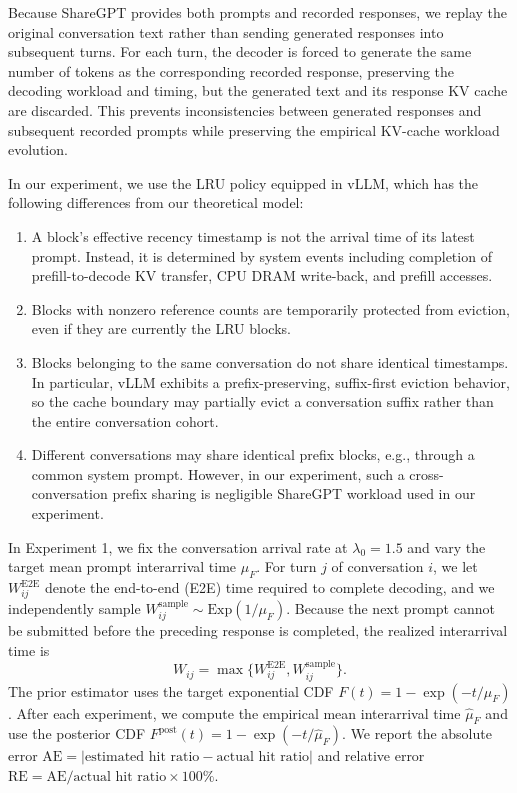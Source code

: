 \documentclass{article}
\theoremstyle{definition}
\newcommand{\Exp}{\text{Exp}}
\begin{document}
Because ShareGPT provides both prompts and recorded responses, we replay the original conversation text rather than sending generated responses into subsequent turns. For each turn, the decoder is forced to generate the same number of tokens as the corresponding recorded response, preserving the decoding workload and timing, but the generated text and its response KV cache are discarded. This prevents inconsistencies between generated responses and subsequent recorded prompts while preserving the empirical KV-cache workload evolution.

In our experiment, we use the LRU policy equipped in vLLM, which has the following differences from our theoretical model:
\begin{enumerate}
    \item A block's effective recency timestamp is not the arrival time of its latest prompt. Instead, it is determined by system events including completion of prefill-to-decode KV transfer, CPU DRAM write-back, and prefill accesses.
    \item Blocks with nonzero reference counts are temporarily protected from eviction, even if they are currently the LRU blocks.
    \item Blocks belonging to the same conversation do not share identical timestamps. In particular, vLLM exhibits a prefix-preserving, suffix-first eviction behavior, so the cache boundary may partially evict a conversation suffix rather than the entire conversation cohort.
    \item Different conversations may share identical prefix blocks, e.g., through a common system prompt. However, in our experiment, such a cross-conversation prefix sharing is negligible ShareGPT workload used in our experiment.
\end{enumerate}

In Experiment 1, we fix the conversation arrival rate at $\lambda_0=1.5$ and vary the target mean prompt interarrival time $\mu_F$. For turn $j$ of conversation $i$, we let $W_{ij}^{\mathrm{E2E}}$ denote the end-to-end (E2E) time required to complete decoding, and we independently sample $W_{ij}^{\mathrm{sample}}\sim\Exp(1/\mu_F)$. Because the next prompt cannot be submitted before the preceding response is completed, the realized interarrival time is
\begin{equation}
\label{equ: Actual Interarrival time}
    W_{ij}=\max\{W_{ij}^{\mathrm{E2E}},W_{ij}^{\mathrm{sample}}\}.
\end{equation}
The prior estimator uses the target exponential CDF $F(t)=1-\exp(-t/\mu_F)$. After each experiment, we compute the empirical mean interarrival time $\hat\mu_F$ and use the posterior CDF $F^{\mathrm{post}}(t)=1-\exp(-t/\hat\mu_F)$. We report the absolute error $\mathrm{AE}=|\text{estimated hit ratio}-\text{actual hit ratio}|$ and relative error $\mathrm{RE}=\mathrm{AE}/\text{actual hit ratio}\times100\%$.
\end{document}

